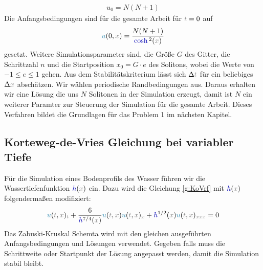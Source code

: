\documentclass[10pt,fleqn,%
reqno,a4paper]{article}
\makeatletter
\def\mathcolor#1#{\@mathcolor{#1}}
\def\@mathcolor#1#2#3{%
        \protect\leavevmode
        \begingroup\color#1{#2}#3\endgroup
}
\newcommand{\nx}{\mathcolor{gray}{x}}
\newcommand{\nt}{\mathcolor{gray}{t}}
\newcommand{\nnu}{\mathcolor{cyan!70!black}{u}}
\newcommand{\ncosh}{\mathcolor{blue!70!black}{\cosh}}
\newcommand{\nh}{\mathcolor{blue!70!black}{h}}
\makeatother
\begin{document}
\begin{align*}
  u_{0} = N(N+1) 
\end{align*}
Die Anfangsbedingungen sind für die gesamte Arbeit für $ \nt = 0 $ auf
\begin{align*}
        \nnu (0,\nx) = \frac{N(N+1)}{\ncosh^2(\nx)}
\end{align*}
gesetzt.
Weitere Simulationsparameter sind, die Größe $ G $ des Gitter, die Schrittzahl $ n $ und die Startposition $ x_0=G\cdot e $ des Solitons, wobei die Werte von $ -1 \leqslant e \leqslant 1$ gehen.
Aus dem Stabilitätskriterium lässt sich $ \Delta \nt $ für ein beliebiges $ \Delta \nx $ abschätzen. 
Wir wählen periodische Randbedingungen aus.
Daraus erhalten wir eine Lösung die uns $ N $ Solitonen in der Simulation erzeugt, damit ist $ N $ ein weiterer Paramter zur Steuerung der Simulation für die gesamte Arbeit.
Dieses Verfahren bildet die Grundlagen für das Problem 1 im nächsten Kapitel. 
\subsection{Korteweg-de-Vries Gleichung bei variabler Tiefe} \label{sec:A2}
Für die Simulation eines Bodenprofils des Wasser führen wir die Wassertiefenfunktion $\nh (\nx) $ ein.
Dazu wird die Gleichung \ref{g:KoVrf} mit $ \nh(\nx) $ folgendermaßen  modifiziert:
\begin{align}
        \nnu (\nt, \nx) _{\nt} + \frac{6}{\nh^{7/4}(\nx)}\nnu(\nt, \nx) \nnu (\nt, \nx) _{\nx} +  \nh^{1/2}(\nx)\nnu (\nt, \nx)_{\nx \nx \nx} = 0 \label{g:KoVrf2}
\end{align}
Das Zabuski-Kruskal Schemta wird mit den gleichen ausgeführten Anfangsbedingungen und Lösungen verwendet. 
Gegeben falls muss die Schrittweite oder Startpunkt der Lösung angepasst werden, damit die Simulation stabil bleibt.

\newpage
\end{document}
